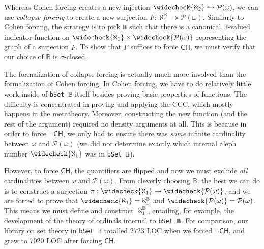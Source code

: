 \documentclass[sigplan,10pt,review]{acmart}
\newcommand{\lil}{\lstinline}
\newcommand{\CH}{\mathsf{CH}}
\theoremstyle{definition}
\begin{document}
Whereas Cohen forcing creates a new injection \(\widecheck{\aleph_2} \hookrightarrow \mathcal{P}(\omega)\), we can use \emph{collapse forcing} to create a new surjection \(F : \aleph_1^{\mathbb{B}} \twoheadrightarrow \mathcal{P}(\omega)\).
Similarly to Cohen forcing, the strategy is to pick \lil{𝔹} such that there is a canonical \lil{𝔹}-valued indicator function on \(\widecheck{\aleph_1} \times \widecheck{\mathcal{P}(\omega)}\) representing the graph of a surjection \(\widetilde{F}\).
To show that \(\widetilde{F}\) suffices to force \(\CH\), we must verify that our choice of \(\mathbb{B}\) is \(\sigma\)-closed.
%

The formalization of collapse forcing is actually much more involved than the formalization of Cohen forcing. In Cohen forcing, we have to do relatively little work inside of \lil{bSet 𝔹} itself besides proving basic properties of functions. The difficulty is concentrated in proving and applying the CCC, which mostly happens in the metatheory. Moreover, constructing the new function (and the rest of the argument) required no density arguments at all. This is because in order to force \(\neg \CH\), we only had to ensure there was \emph{some} infinite cardinality between \(\omega\) and \(\mathcal{P}(\omega)\) (we did not determine exactly which internal aleph number \(\widecheck{\aleph_1}\) was in \lil{bSet 𝔹}).

However, to force \(\CH\), the quantifiers are flipped and now we must exclude \emph{all} cardinalities between \(\omega\) and \(\mathcal{P}(\omega)\). From cleverly choosing \(\mathbb{B}\), the best we can do is to construct a surjection \(\pi : \widecheck{\aleph_1} \twoheadrightarrow \widecheck{\mathcal{P}(\omega)}\), and we are forced to prove that \(\widecheck{\aleph_1} = \aleph_1^{\mathbb{B}}\) and \(\widecheck{\mathcal{P}(\omega)} = \mathcal{P}(\omega)\). This means we must define and construct \(\aleph_1^{\mathbb{B}}\), entailing, for example, the development of the theory of ordinals internal to \lstinline{bSet 𝔹}. For comparison, our library on set theory in \lstinline{bSet 𝔹} totalled 2723 LOC when we forced \(\neg \CH\), and grew to 7020 LOC after forcing \(\CH\).

\end{document}
